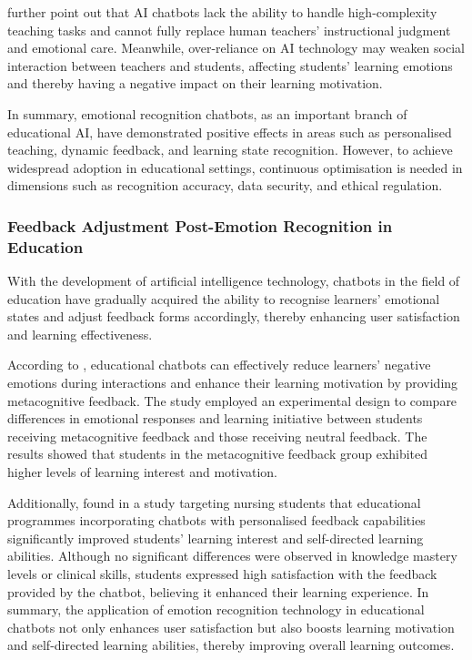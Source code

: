 \documentclass{xum_review}
\begin{document}
\citet{siregar2024ai} further point out that AI chatbots lack the ability to
handle high-complexity teaching tasks and cannot fully replace human teachers'
instructional judgment and emotional care. Meanwhile, over-reliance on AI
technology may weaken social interaction between teachers and students,
affecting students' learning emotions and thereby having a negative impact on
their learning motivation. 

In summary, emotional recognition chatbots, as an important branch of
educational AI, have demonstrated positive effects in areas such as personalised
teaching, dynamic feedback, and learning state recognition. However, to achieve
widespread adoption in educational settings, continuous optimisation is needed
in dimensions such as recognition accuracy, data security, and ethical
regulation. 

\subsubsection{Feedback Adjustment Post-Emotion Recognition in Education}
With the development of artificial intelligence technology, chatbots in the
field of education have gradually acquired the ability to recognise learners'
emotional states and adjust feedback forms accordingly, thereby enhancing user
satisfaction and learning effectiveness. 

According to \citet{yin2024effects}, educational chatbots
can effectively reduce learners' negative emotions during interactions and
enhance their learning motivation by providing metacognitive feedback. The study
employed an experimental design to compare differences in emotional responses
and learning initiative between students receiving metacognitive feedback and
those receiving neutral feedback. The results showed that students in the
metacognitive feedback group exhibited higher levels of learning interest and
motivation. 

Additionally, \citet{han2022development} found in a study targeting nursing
students that educational programmes incorporating chatbots with personalised
feedback capabilities significantly improved students' learning interest and
self-directed learning abilities. Although no significant differences were
observed in knowledge mastery levels or clinical skills, students expressed high
satisfaction with the feedback provided by the chatbot, believing it enhanced
their learning experience. In summary, the application of emotion recognition
technology in educational chatbots not only enhances user satisfaction but also
boosts learning motivation and self-directed learning abilities, thereby
improving overall learning outcomes.
\end{document}
